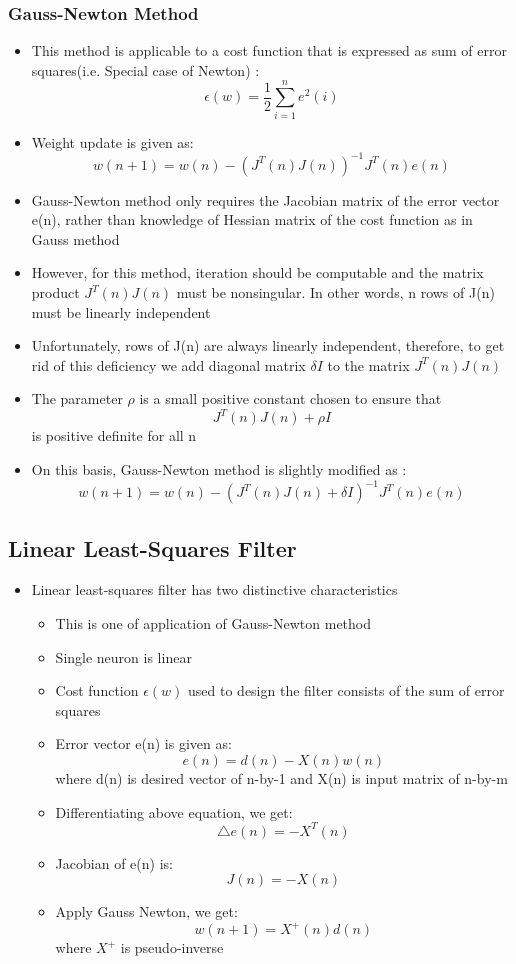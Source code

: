 \documentclass[12pt]{article}
\begin{document}
\subsubsection{Gauss-Newton Method}

\begin{itemize}
	\item This method is applicable to a cost function that is expressed as sum of error squares(i.e. Special case of Newton) : $$ \epsilon(w) = \frac{1}{2} \sum_{i = 1}^{n} e^2(i)$$
	\item Weight update is given as: $$ w(n+1) = w(n) - (J^T(n) J(n) )^{-1}  J^T(n) e(n) $$
	\item Gauss-Newton method only requires the Jacobian matrix of the error vector e(n), rather than knowledge of Hessian matrix of the cost function as in Gauss method
	\item However, for this method, iteration should be computable and the matrix product $J^T(n) J(n)$ must be nonsingular. In other words, n rows of J(n) must be linearly independent
	\item Unfortunately, rows of J(n) are always linearly independent, therefore, to get rid of this deficiency we add diagonal matrix $\delta I$ to the matrix $J^T(n)J(n)$
	\item The parameter $\rho$ is a small positive constant chosen to ensure that $$ J^T(n) J(n) + \rho I $$ is positive definite for all n
	\item On this basis, Gauss-Newton method is slightly modified as : $$ w(n + 1) = w(n) - (J^T(n) J(n) + \delta I)^{-1}  J^T(n) e(n) $$
\end{itemize}

\subsection{Linear Least-Squares Filter}

\begin{itemize}
	\item Linear least-squares filter has two distinctive characteristics
		\begin{itemize}
			\item This is one of application of Gauss-Newton method
			\item Single neuron is linear
			\item Cost function $\epsilon(w)$ used to design the filter consists of the sum of error squares
			\item Error vector e(n) is given as: $$ e(n) = d(n) - X(n)w(n) $$
			where d(n) is desired vector of n-by-1 and X(n) is input matrix of n-by-m 
			\item Differentiating above equation, we get: $$ \triangle e(n) = -X^T(n) $$
			\item Jacobian of e(n) is: $$ J(n) = - X(n) $$
			\item Apply Gauss Newton, we get: $$ w(n + 1) = X^{+}(n) d(n) $$ where $X^{+}$ is pseudo-inverse
		\end{itemize}
\end{itemize}
\end{document}
